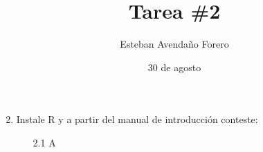 \documentclass[letterpaper, 12pt]{article}
\title{Tarea \#2}
\author{Esteban Avendaño Forero}
\date{30 de agosto}
\begin{document}

\maketitle

\begin{enumerate}
\setcounter{enumi}{1}
\item Instale R y a partir del manual de introducción conteste:
\begin{enumerate}
\item[2.1] A
\end{enumerate}
\end{enumerate}
\end{document}
